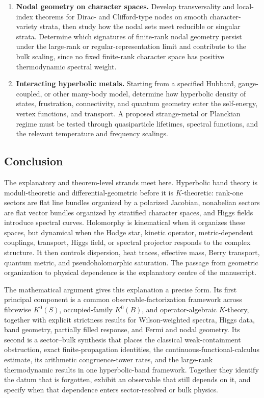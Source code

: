 \documentclass[11pt]{article}
\theoremstyle{definition}
\theoremstyle{remark}
\begin{document}
\begin{enumerate}[label=\arabic*.,leftmargin=2.0em]
\item \textbf{Nodal geometry on character spaces.}
  Develop transversality and local-index theorems for Dirac- and
  Clifford-type nodes on smooth character-variety strata, then study how the
  nodal sets meet reducible or singular strata.  Determine which signatures
  of finite-rank nodal geometry persist under the large-rank or
  regular-representation limit and contribute to the bulk scaling, since no
  fixed finite-rank character space has positive thermodynamic spectral
  weight.

\item \textbf{Interacting hyperbolic metals.}
  Starting from a specified Hubbard, gauge-coupled, or other many-body model,
  determine how hyperbolic density of states, frustration, connectivity, and
  quantum geometry enter the self-energy, vertex functions, and transport.
  A proposed strange-metal or Planckian regime must be tested through
  quasiparticle lifetimes, spectral functions, and the relevant temperature
  and frequency scalings.

\end{enumerate}

\subsection{Conclusion}

The explanatory and theorem-level strands meet here.  Hyperbolic band theory
is moduli-theoretic and differential-geometric before it is \(K\)-theoretic:
rank-one sectors are flat line bundles organized by a polarized Jacobian,
nonabelian sectors are flat vector bundles organized by stratified character
spaces, and Higgs fields introduce spectral curves.  Holomorphy is
kinematical when it organizes these spaces, but dynamical when the Hodge star,
kinetic operator, metric-dependent couplings, transport, Higgs field, or
spectral projector responds to the complex structure.  It then controls
dispersion, heat traces, effective mass, Berry transport, quantum metric, and
pseudoholomorphic saturation.  The passage from geometric organization to
physical dependence is the explanatory centre of the manuscript.

The mathematical argument gives this explanation a precise form.  Its first
principal component is a common observable-factorization framework across
fibrewise \(K^0(S)\), occupied-family \(K^0(B)\), and operator-algebraic
\(K\)-theory, together with explicit strictness results for Wilson-weighted
spectra, Higgs data, band geometry, partially filled response, and Fermi and
nodal geometry.  Its second is a sector--bulk synthesis that places the
classical weak-containment obstruction, exact finite-propagation identities,
the continuous-functional-calculus estimate, its arithmetic congruence-tower
rates, and the large-rank thermodynamic results in one hyperbolic-band
framework.  Together they
identify the datum that is forgotten, exhibit an observable that still
depends on it, and specify when that dependence enters sector-resolved or
bulk physics.
\end{document}
